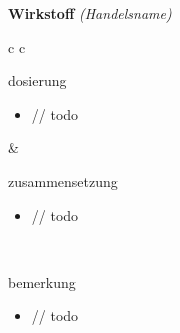 \begin{frame}{
    \textbf{Wirkstoff}
    \textit{(Handelsname)}
}
    \begin{tabular}{c c}
        \begin{beamercolorbox}[wd=\boxwidth\textwidth,ht=\boxheight\textheight,sep=1em]{dosierung}
            \begin{itemize}
                \item // todo
            \end{itemize}
        \end{beamercolorbox} & 
        \begin{beamercolorbox}[wd=\boxwidth\textwidth,ht=\boxheight\textheight,sep=1em]{zusammensetzung}
            \begin{itemize}
                \item // todo
            \end{itemize}
        \end{beamercolorbox} \\
        \begin{beamercolorbox}[wd=\textwidth,ht=\boxheight\textheight,sep=1em]{bemerkung}
            \begin{itemize}
                \item // todo
            \end{itemize}
        \end{beamercolorbox} \\
    \end{tabular}
\end{frame}
